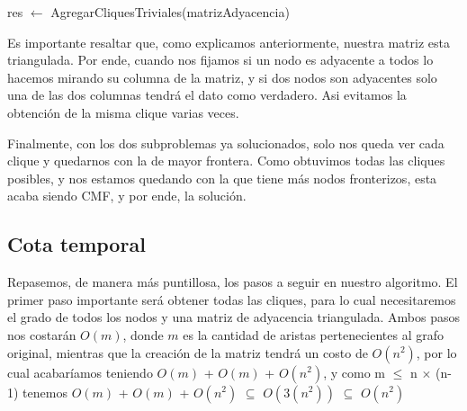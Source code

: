 \begin{algorithm}[H]
	\NoCaptionOfAlgo
	\caption{}
	res $\leftarrow$ AgregarCliquesTriviales(matrizAdyacencia)
	
\end{algorithm}

\begin{algorithm}[H]
	\NoCaptionOfAlgo
	\caption{}
\end{algorithm}

Es importante resaltar que, como explicamos anteriormente, nuestra matriz esta triangulada. Por ende, cuando nos fijamos si un nodo es adyacente a todos lo hacemos mirando su columna de la matriz, y si dos nodos son adyacentes solo una de las dos columnas tendrá el dato como verdadero. Asi evitamos la obtención de la misma clique varias veces.

Finalmente, con los dos subproblemas ya solucionados, solo nos queda ver cada clique y quedarnos con la de mayor frontera. Como obtuvimos todas las cliques posibles, y nos estamos quedando con la que tiene más nodos fronterizos, esta acaba siendo CMF, y por ende, la solución.

\subsection{Cota temporal}
Repasemos, de manera más puntillosa, los pasos a seguir en nuestro algoritmo. El primer paso importante será obtener todas las cliques, para lo cual necesitaremos el grado de todos los nodos y una matriz de adyacencia triangulada. Ambos pasos nos costarán $O(m)$, donde $m$ es la cantidad de aristas pertenecientes al grafo original, mientras que la creación de la matriz tendrá un costo de $O(n^2)$, por lo cual acabaríamos teniendo $O(m)$ + $O(m)$ + $O(n^2)$, y como m $\leq$ n $\times$ (n-1) tenemos $O(m)$ + $O(m)$ + $O(n^2)$ $\subseteq$ $O(3(n^2))$ $\subseteq$ $O(n^2)$

